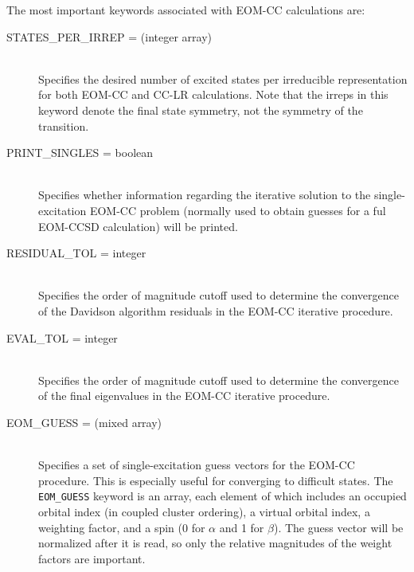 The most important keywords associated with EOM-CC calculations are:
\begin{description}
\item[STATES\_PER\_IRREP = (integer array)]\mbox{}\\
Specifies the desired number of excited states per irreducible representation 
for both EOM-CC and CC-LR calculations.  Note that the irreps in this
keyword denote the final state symmetry, not the symmetry of the transition.  
\item[PRINT\_SINGLES = boolean]\mbox{}\\
Specifies whether information regarding the iterative solution to the
single-excitation EOM-CC problem (normally used to obtain guesses for a
ful EOM-CCSD calculation) will be printed.
\item[RESIDUAL\_TOL = integer]\mbox{}\\
Specifies the order of magnitude cutoff used to determine the convergence of 
the Davidson algorithm residuals in the EOM-CC iterative procedure.
\item[EVAL\_TOL = integer]\mbox{}\\
Specifies the order of magnitude cutoff used to determine the convergence
of the final eigenvalues in the EOM-CC iterative procedure.
\item[EOM\_GUESS = (mixed array)]\mbox{}\\ Specifies a set
of single-excitation guess vectors for the EOM-CC procedure.  This is
especially useful for converging to difficult states.  The {\tt EOM\_GUESS}
keyword is an array, each element of which includes an occupied orbital
index (in coupled cluster ordering), a virtual orbital index, a weighting
factor, and a spin (0 for $\alpha$ and 1 for $\beta$).  The guess vector
will be normalized after it is read, so only the relative magnitudes of the
weight factors are important.
\end{description}

